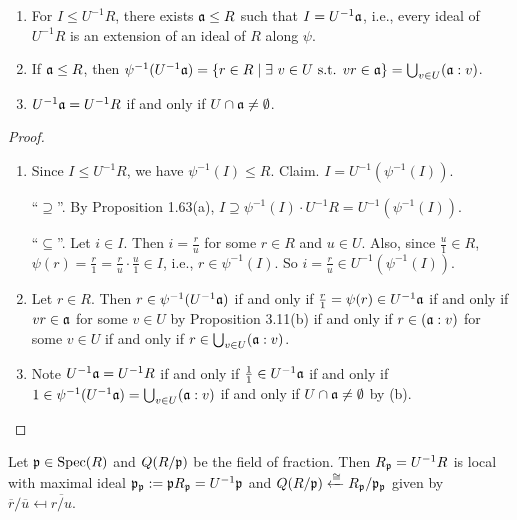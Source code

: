 \begin{proposition}
    \begin{enumerate}
        \item For $I \leq U^{-1}R$, there exists $\mathfrak{a} \leq R$ such that $I = U^{-1}\mathfrak{a}$, i.e., every ideal of $U^{-1}R$ is an extension of an ideal of $R$ along $\psi$.
        \item If $\mathfrak{a} \leq R$, then $\psi^{-1}(U^{-1}\mathfrak{a}) =\{r \in R \mid \exists \  v \in U \text{ s.t. }v r \in \mathfrak{a}\} = \bigcup_{v \in U} (\mathfrak{a}:v)$.
        \item $U^{-1}\mathfrak{a} = U^{-1}R$ if and only if $U \cap \mathfrak{a} \neq \emptyset$.
    \end{enumerate}
\end{proposition}

\begin{proof}
    \begin{enumerate}
        \item Since $I \leq U^{-1}R$, we have $\psi^{-1}(I) \leq R$. Claim. $I = U^{-1} (\psi^{-1}(I))$. \par 
            ``$\supseteq$''. By Proposition 1.63(a), $I \supseteq \psi^{-1}(I) \cdot U^{-1}R  = U^{-1} (\psi^{-1}(I))$. \par  
            ``$\subseteq$''. Let $i \in I$. Then $i = \frac{r}{u}$ for some $r \in R$ and $u \in U$. Also, since $\frac{u}{1} \in R$, $\psi(r) = \frac{r}{1} = \frac{r}{u} \cdot \frac{u}{1} \in I$, i.e., $r \in \psi^{-1}(I)$. So $i = \frac{r}{u} \in U^{-1} (\psi^{-1}(I))$.
        \item  
            Let $r \in R$. Then $r \in \psi^{-1}(U^{-1}\mathfrak{a})$ if and only if $\frac{r}{1} = \psi(r) \in U^{-1}\mathfrak{a}$ if and only if $vr \in \mathfrak{a}$ for some $v \in U$ by Proposition 3.11(b) if and only if $r \in (\mathfrak{a}:v)$ for some $v \in U$ if and only if $r \in \bigcup_{v \in U}(\mathfrak{a}:v)$. 
        \item
            Note $U^{-1}\mathfrak{a} = U^{-1}R$ if and only if $\frac{1}{1} \in U^{-1}\mathfrak{a}$ if and only if $1 \in \psi^{-1}(U^{-1}\mathfrak{a}) = \bigcup_{v \in U}(\mathfrak{a}:v)$ if and only if $U \cap \mathfrak{a} \neq \emptyset$ by (b). \qedhere
    \end{enumerate}
\end{proof}

\begin{corollary}
    Let $\mathfrak{p} \in \operatorname{Spec}(R)$ and $Q(R/\mathfrak{p})$ be the field of fraction. Then $R_{\mathfrak{p}} = U^{-1}R$ is local with maximal ideal $\mathfrak{p}_{\mathfrak{p}} := \mathfrak{p} R_{\mathfrak{p}} = U^{-1}\mathfrak{p}$ and $Q(R/\mathfrak{p}) \xleftarrow \cong R_{\mathfrak{p}}/\mathfrak{p}_{\mathfrak{p}}$ given by $\overbar r / \overbar u \mapsfrom \overbar {r/u}$.
\end{corollary}

